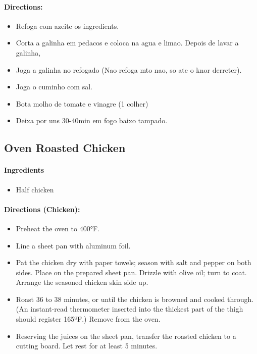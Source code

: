 \documentclass{article}
\begin{document}
\paragraph{Directions:}
\begin{itemize}
	\item Refoga com azeite os ingredients.
	\item Corta a galinha em pedacos e coloca na agua e limao. Depois de lavar a galinha,
	\item Joga a galinha no refogado (Nao refoga mto nao, so ate o knor derreter). 
	\item Joga o cuminho com sal.
	\item Bota molho de tomate e vinagre (1 colher)
	\item Deixa por uns 30-40min em fogo baixo tampado.
\end{itemize}

\subsection{Oven Roasted Chicken}

\paragraph{Ingredients}
\begin{itemize}
	\item Half chicken
\end{itemize}

\paragraph{Directions (Chicken):}
\begin{itemize}
	\item Preheat the oven to 400°F. 
	\item Line a sheet pan with aluminum foil. 
	\item Pat the chicken dry with paper towels; season with salt and pepper on
	both sides. Place on the prepared sheet pan. Drizzle with olive oil; turn
	to coat. Arrange the seasoned chicken skin side up. 
	\item Roast 36 to 38 minutes, or until the chicken is browned and cooked
	through. (An instant-read thermometer inserted into the thickest part
	of the thigh should register 165ºF.) Remove from the oven. 
	\item Reserving the juices on the sheet pan, transfer the roasted chicken to a
	cutting board. Let rest for at least 5 minutes.
\end{itemize}
\end{document}
